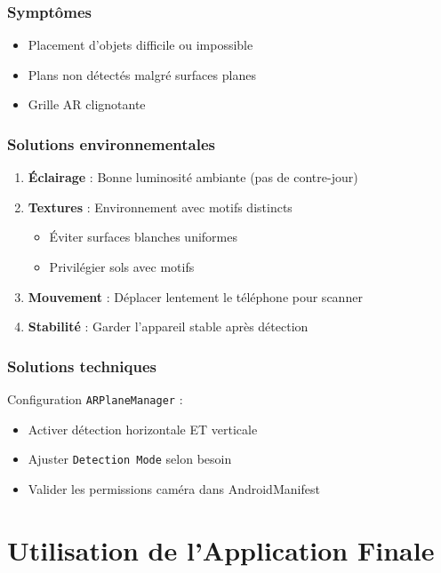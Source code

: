 \documentclass[12pt,a4paper]{article}
\begin{document}
\subsubsection{Symptômes}
\begin{itemize}
    \item Placement d'objets difficile ou impossible
    \item Plans non détectés malgré surfaces planes
    \item Grille AR clignotante
\end{itemize}

\subsubsection{Solutions environnementales}
\begin{enumerate}
    \item \textbf{Éclairage} : Bonne luminosité ambiante (pas de contre-jour)
    \item \textbf{Textures} : Environnement avec motifs distincts
    \begin{itemize}
        \item Éviter surfaces blanches uniformes
        \item Privilégier sols avec motifs
    \end{itemize}
    \item \textbf{Mouvement} : Déplacer lentement le téléphone pour scanner
    \item \textbf{Stabilité} : Garder l'appareil stable après détection
\end{enumerate}

\subsubsection{Solutions techniques}
Configuration \texttt{ARPlaneManager} :
\begin{itemize}
    \item Activer détection horizontale ET verticale
    \item Ajuster \texttt{Detection Mode} selon besoin
    \item Valider les permissions caméra dans AndroidManifest
\end{itemize}

\section{Utilisation de l'Application Finale}
\end{document}
